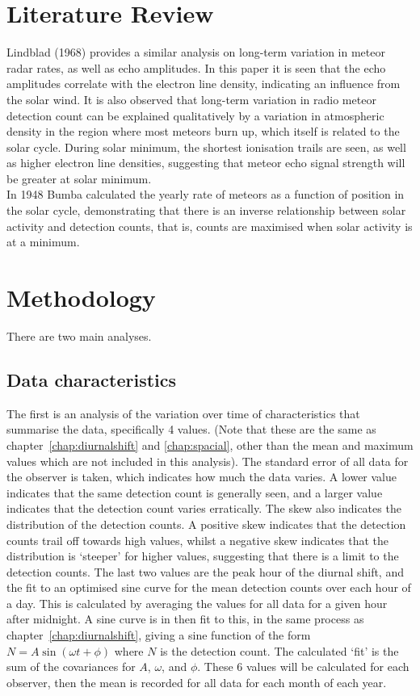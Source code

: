 \section{Literature Review}
Lindblad (1968) \cite{lindblad} provides a similar analysis on long-term variation in meteor radar rates, as well as echo amplitudes. In this paper it is seen that the echo amplitudes correlate with the electron line density, indicating an influence from the solar wind. It is also observed that long-term variation in radio meteor detection count can be explained qualitatively by a variation in atmospheric density in the region where most meteors burn up, which itself is related to the solar cycle. During solar minimum, the shortest ionisation trails are seen, as well as higher electron line densities, suggesting that meteor echo signal strength will be greater at solar minimum.\\
In 1948 Bumba \cite{bumba} calculated the yearly rate of meteors as a function of position in the solar cycle, demonstrating that there is an inverse relationship between solar activity and detection counts, that is, counts are maximised when solar activity is at a minimum.
\section{Methodology}
There are two main analyses. 
\subsection{Data characteristics}
The first is an analysis of the variation over time of characteristics that summarise the data, specifically 4 values. (Note that these are the same as chapter~\ref{chap:diurnalshift} and \ref{chap:spacial}, other than the mean and maximum values which are not included in this analysis). The standard error of all data for the observer is taken, which indicates how much the data varies. A lower value indicates that the same detection count is generally seen, and a larger value indicates that the detection count varies erratically. The skew also indicates the distribution of the detection counts. A positive skew indicates that the detection counts trail off towards high values, whilst a negative skew indicates that the distribution is `steeper' for higher values, suggesting that there is a limit to the detection counts. The last two values are the peak hour of the diurnal shift, and the fit to an optimised sine curve for the mean detection counts over each hour of a day. This is calculated by averaging the values for all data for a given hour after midnight. A sine curve is in then fit to this, in the same process as chapter~\ref{chap:diurnalshift}, giving a sine function of the form $N = A \sin \left( \omega t + \phi \right)$ where $N$ is the detection count. The calculated `fit' is the sum of the covariances for $A$, $\omega$, and $\phi$. These 6 values will be calculated for each observer, then the mean is recorded for all data for each month of each year.
